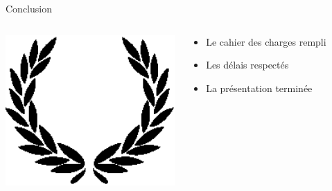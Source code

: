 \documentclass[compress, 12pt]{beamer}
\begin{document}
\begin{frame}{Conclusion}
    \begin{columns}
        \begin{column}{.2\textwidth}
            \includegraphics[width=1.3\textwidth]{./pix/sym_victory}
        \end{column}
        \begin{column}{.6\textwidth}
        \begin{itemize}
            \itemsep2em
	        \item Le cahier des charges rempli
	        \pause
	        \item Les délais respectés
	        \pause
	        \item La présentation terminée
        \end{itemize}
        \end{column}
    \end{columns}
\end{frame}
\end{document}
